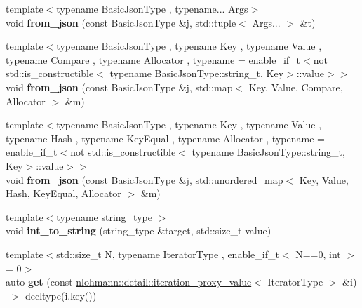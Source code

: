 \begin{DoxyCompactItemize}
\item 
\mbox{\label{namespacenlohmann_1_1detail_a8b99ec9b29f3f20a18fc4281fb784e49}} 
{\footnotesize template$<$typename Basic\+Json\+Type , typename... Args$>$ }\\void {\bfseries from\+\_\+json} (const Basic\+Json\+Type \&j, std\+::tuple$<$ Args... $>$ \&t)
\item 
\mbox{\label{namespacenlohmann_1_1detail_ae93147a54d2740228ef16a5e6210ca3e}} 
{\footnotesize template$<$typename Basic\+Json\+Type , typename Key , typename Value , typename Compare , typename Allocator , typename  = enable\+\_\+if\+\_\+t$<$not std\+::is\+\_\+constructible$<$                                     typename Basic\+Json\+Type\+::string\+\_\+t, Key$>$\+::value$>$$>$ }\\void {\bfseries from\+\_\+json} (const Basic\+Json\+Type \&j, std\+::map$<$ Key, Value, Compare, Allocator $>$ \&m)
\item 
\mbox{\label{namespacenlohmann_1_1detail_aef5c8ea108f4d2b03fb4a635617510de}} 
{\footnotesize template$<$typename Basic\+Json\+Type , typename Key , typename Value , typename Hash , typename Key\+Equal , typename Allocator , typename  = enable\+\_\+if\+\_\+t$<$not std\+::is\+\_\+constructible$<$                                     typename Basic\+Json\+Type\+::string\+\_\+t, Key$>$\+::value$>$$>$ }\\void {\bfseries from\+\_\+json} (const Basic\+Json\+Type \&j, std\+::unordered\+\_\+map$<$ Key, Value, Hash, Key\+Equal, Allocator $>$ \&m)
\item 
\mbox{\label{namespacenlohmann_1_1detail_a3c45286b0a2f15ea0a756cb87a76cf9b}} 
{\footnotesize template$<$typename string\+\_\+type $>$ }\\void {\bfseries int\+\_\+to\+\_\+string} (string\+\_\+type \&target, std\+::size\+\_\+t value)
\item 
\mbox{\label{namespacenlohmann_1_1detail_acc422c11342b31368f610b6f96fcedc6}} 
{\footnotesize template$<$std\+::size\+\_\+t N, typename Iterator\+Type , enable\+\_\+if\+\_\+t$<$ N==0, int $>$  = 0$>$ }\\auto {\bfseries get} (const \mbox{\hyperlink{classnlohmann_1_1detail_1_1iteration__proxy__value}{nlohmann\+::detail\+::iteration\+\_\+proxy\+\_\+value}}$<$ Iterator\+Type $>$ \&i) -\/$>$ decltype(i.\+key())

\end{DoxyCompactItemize}
